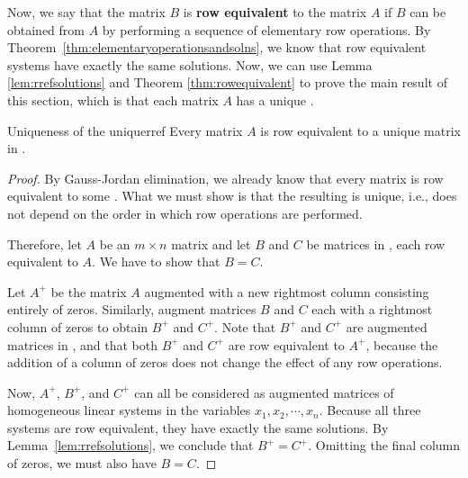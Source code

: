 Now, we say that the matrix $B$ is \textbf{row equivalent} to the matrix $A$ if $B$ can be obtained from $A$ by performing a sequence of elementary row operations. By Theorem~\ref{thm:elementaryoperationsandsolns}, we know that row equivalent systems have exactly the same solutions. Now, we can use Lemma \ref{lem:rrefsolutions} and Theorem \ref{thm:rowequivalent} to prove the main result of this section, which is that each matrix $A$ has a unique {\rref}.

\begin{theorem}{Uniqueness of the {\RREF}}{uniquerref}
  Every matrix $A$ is row equivalent to a unique matrix in {\rref}.
\end{theorem}

\begin{proof}
  By Gauss-Jordan elimination, we already know that every matrix is
  row equivalent to some {\rref}. What we must show is that the
  resulting {\rref} is unique, i.e., does not depend on the order in
  which row operations are performed.
  
  Therefore, let $A$ be an $m \times n$ matrix and let $B$ and $C$ be
  matrices in {\rref}, each row equivalent to $A$. We have to show
  that $B=C$.

  Let $A^{+}$ be the matrix $A$ augmented with a new rightmost column
  consisting entirely of zeros. Similarly, augment matrices $B$ and
  $C$ each with a rightmost column of zeros to obtain $B^{+}$ and
  $C^{+}$. Note that $B^{+}$ and $C^{+}$ are augmented matrices in
  {\rref}, and that both $B^{+}$ and $C^{+}$ are row equivalent to
  $A^{+}$, because the addition of a column of zeros does not change
  the effect of any row operations.

  Now, $A^{+}$, $B^{+}$, and $C^{+}$ can all be considered as
  augmented matrices of homogeneous linear systems in the variables
  $x_1, x_2, \cdots, x_n$. Because all three systems are row
  equivalent, they have exactly the same solutions. By
  Lemma~\ref{lem:rrefsolutions}, we conclude that $B^{+}=C^{+}$.
  Omitting the final column of zeros, we must also have $B=C$.
\end{proof}

